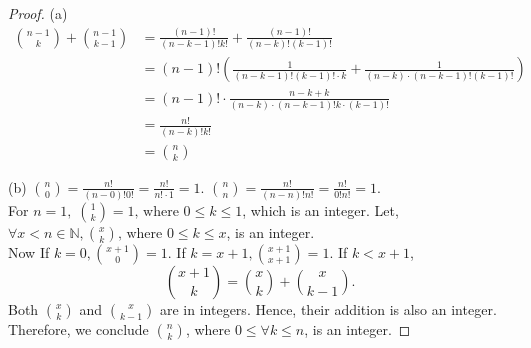 \documentclass[12pt]{article}
\begin{document}
\begin{proof}
(a) \begin{align*}
\binom{n -1}{k} + \binom{n - 1}{k - 1}
& = \frac{(n-1)!}{(n-k-1)!k!} + \frac{(n-1)!}{(n-k)!(k-1)!} \\
& = (n-1)! \left( \frac{1}{(n-k-1)!(k-1)!\cdot k} + \frac{1}{(n-k)\cdot (n-k-1)!(k-1)!} \right) \\
& = (n-1)!\cdot \frac{n-k+k}{(n-k)\cdot (n-k-1)! k\cdot (k-1)!} \\
& = \frac{n!}{(n-k)!k!} \\
& = \binom{n}{k}
\end{align*}

(b) $\binom{n}{0} = \frac{n!}{(n-0)!0!} = \frac{n!}{n!\cdot 1} = 1$. $\binom{n}{n} = \frac{n!}{(n-n)!n!} = \frac{n!}{0!n!} = 1$.\\
For $n = 1, \; \binom{1}{k} = 1 \text{, where } 0 \leq k \leq 1$, which is an integer. Let, $\forall x < n \in \mathbb{N}, \binom{x}{k} \text{, where } 0 \leq k \leq x$, is an integer. \\
Now If $k = 0, \binom{x + 1}{0} = 1$. If $k = x + 1, \binom{x + 1}{x + 1} = 1$.
If $k < x + 1$,
\[
\binom{x + 1}{k} = \binom{x}{k} + \binom{x}{k - 1}.
\]
Both $\binom{x}{k}$ and $\binom{x}{k - 1}$ are in integers. Hence, their addition is also an integer. Therefore, we conclude $\binom{n}{k}$, where $0 \leq \forall k \leq n$, is an integer.


\end{proof}
\end{document}
